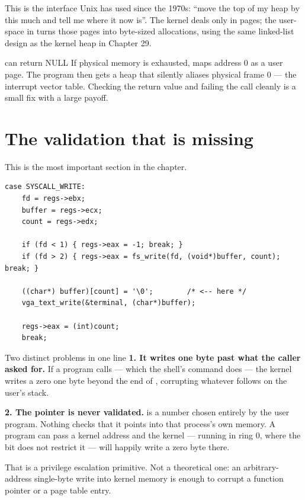 This is the interface Unix has used since the 1970s: ``move the top of my heap by this much and tell
me where it now is''. The kernel deals only in pages; the user-space  in
 turns those pages into byte-sized allocations, using the same
linked-list design as the kernel heap in Chapter 29.

\begin{warn}{ can return NULL}
If physical memory is exhausted,  maps address 0 as a user page. The program then
gets a heap that silently aliases physical frame 0 --- the interrupt vector table. Checking the
return value and failing the call cleanly is a small fix with a large payoff.
\end{warn}

\section{The validation that is missing}

This is the most important section in the chapter.

\begin{lstlisting}[style=c]
case SYSCALL_WRITE:
    fd = regs->ebx;
    buffer = regs->ecx;
    count = regs->edx;

    if (fd < 1) { regs->eax = -1; break; }
    if (fd > 2) { regs->eax = fs_write(fd, (void*)buffer, count); break; }

    ((char*) buffer)[count] = '\0';        /* <-- here */
    vga_text_write(&terminal, (char*)buffer);

    regs->eax = (int)count;
    break;
\end{lstlisting}

\begin{danger}{Two distinct problems in one line}
\textbf{1. It writes one byte past what the caller asked for.} If a program calls
 --- which the shell's  command does --- the kernel writes
a zero one byte beyond the end of , corrupting whatever follows on the user's stack.

\textbf{2. The pointer is never validated.}  is a number chosen entirely by the user
program. Nothing checks that it points into that process's own memory. A program can pass a kernel
address and the kernel --- running in ring 0, where the  bit does not restrict it
--- will happily write a zero byte there.

That is a privilege escalation primitive. Not a theoretical one: an arbitrary-address single-byte
write into kernel memory is enough to corrupt a function pointer or a page table entry.
\end{danger}

